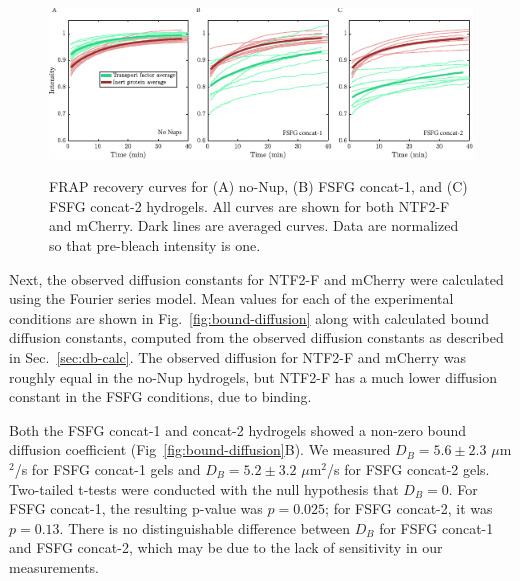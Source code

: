 \begin{figure}[t!]
\caption[FRAP recovery curves.]{FRAP recovery curves for (A) no-Nup, (B) FSFG concat-1, and (C) FSFG concat-2 hydrogels.  All curves are shown for both NTF2-F and mCherry.  Dark lines are averaged curves.  Data are normalized so that pre-bleach intensity is one.}
\centering
\includegraphics[width=\textwidth]{figs/ch04/FRAP-curves}
\label{fig:curves}
\end{figure} 

Next, the observed diffusion constants for NTF2-F and mCherry were calculated using the Fourier series model.  Mean values for each of the experimental conditions are shown in Fig.~\ref{fig:bound-diffusion} along with calculated bound diffusion constants, computed from the observed diffusion constants as described in Sec.~\ref{sec:db-calc}.  The observed diffusion for NTF2-F and mCherry was roughly equal in the no-Nup hydrogels, but NTF2-F has a much lower diffusion constant in the FSFG conditions, due to binding.  

Both the FSFG concat-1 and concat-2 hydrogels showed a non-zero bound diffusion coefficient (Fig~\ref{fig:bound-diffusion}B).  We measured $D_B = 5.6\pm2.3$ $\mu$m$^2$/s for FSFG concat-1 gels and $D_B = 5.2\pm3.2$ $\mu$m$^2$/s for FSFG concat-2 gels.  Two-tailed t-tests were conducted with the null hypothesis that $D_B = 0$.  For FSFG concat-1, the resulting p-value was $p = 0.025$; for FSFG concat-2, it was $p = 0.13$.  There is no distinguishable difference between $D_B$ for FSFG concat-1 and FSFG concat-2, which may be due to the lack of sensitivity in our measurements.


